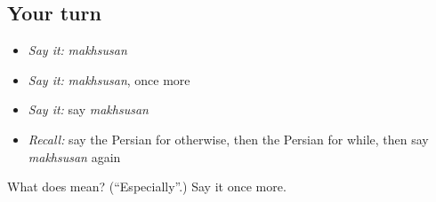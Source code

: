 \subsection*{Your turn}
\begin{itemize}
\raggedright
  \item \emph{Say it:} \emph{makhsusan}
  \item \emph{Say it:} \emph{makhsusan}, once more
  \item \emph{Say it:} say \emph{makhsusan}
  \item \emph{Recall:} say the Persian for otherwise, then the Persian for while, then say \emph{makhsusan} again
\end{itemize}

\begin{tcolorbox}[breakable,colback=teal!4,colframe=teal!35!black,title={Before you move on}]
What does  mean? (\textquotedblleft{}Especially\textquotedblright{}.) Say it once more.
\end{tcolorbox}
